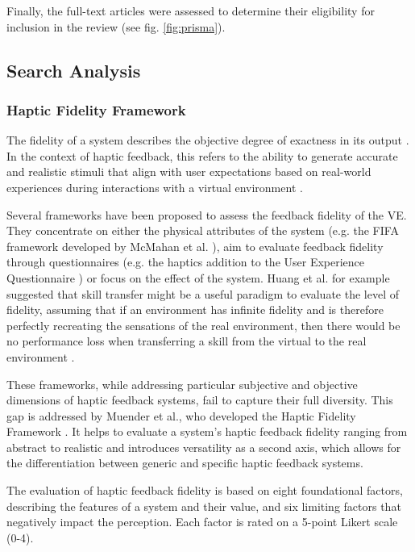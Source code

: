 Finally, the full-text articles were assessed to determine their eligibility for inclusion in the review (see fig. \ref{fig:prisma}).


\subsection{Search Analysis}
\subsubsection{Haptic Fidelity Framework}


The fidelity of a system describes the objective degree of exactness in its output \cite{McMahan2011ExploringGames}. 
In the context of haptic feedback, this refers to the ability to generate accurate and realistic stimuli that align with user expectations based on real-world experiences during interactions with a virtual environment \cite{Muender2022HapticReality}. 

Several frameworks have been proposed to assess the feedback fidelity of the VE. They concentrate on either the physical attributes of the system (e.g. the FIFA framework developed by McMahan et al. \cite{McMahan2011ExploringGames}), aim to evaluate feedback fidelity through questionnaires (e.g. the haptics addition \cite{Boos2017ErweiterungHaptik} to the User Experience Questionnaire \cite{Laugwitz2008ConstructionQuestionnaire}) or focus on the effect of the system. Huang et al. for example suggested that skill transfer might be a useful paradigm to evaluate the level of fidelity, assuming that if an environment has infinite fidelity and is therefore perfectly recreating the sensations of the real environment, then there would be no performance loss when transferring a skill from the virtual to the real environment \cite{Huang2006}.

These frameworks, while addressing particular subjective and objective dimensions of haptic feedback systems, fail to capture their full diversity. This gap is addressed by Muender et al., who developed the Haptic Fidelity Framework \cite{Muender2022HapticReality}. It helps to evaluate a system's haptic feedback fidelity ranging from abstract to realistic and introduces versatility as a second axis, which allows for the differentiation between generic and specific haptic feedback systems. 

The evaluation of haptic feedback fidelity is based on eight foundational factors, describing the features of a system and their value, and six limiting factors that negatively impact the perception. Each factor is rated on a 5-point Likert scale (0-4). 

